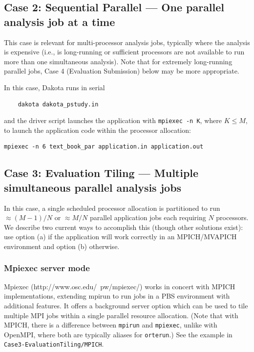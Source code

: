 \subsection{Case 2: Sequential Parallel --- One parallel analysis job at a time}

This case is relevant for multi-processor analysis jobs, typically
where the analysis is expensive (i.e., is long-running or sufficient
processors are not available to run more than one simultaneous
analysis).  Note that for extremely long-running parallel jobs, Case 4 (Evaluation
Submission) below may be more appropriate.

In this case, Dakota runs in serial
\begin{verbatim}
    dakota dakota_pstudy.in
\end{verbatim}
and the driver script launches the application with {\tt mpiexec -n
K}, where $K \leq M$, to launch the application code within the
processor allocation:
\begin{verbatim}
mpiexec -n 6 text_book_par application.in application.out
\end{verbatim}
\subsection{Case 3: Evaluation Tiling --- Multiple simultaneous parallel analysis jobs}

In this case, a single scheduled processor allocation
is partitioned to run $\approx (M-1)/N$ or $\approx M/N$ parallel
application jobs each requiring $N$ processors.  We describe two 
current ways to accomplish this (though other solutions exist): use 
option (a) if the application will work correctly in an MPICH/MVAPICH 
environment and option (b) otherwise.

\subsubsection{Mpiexec server mode}

Mpiexec (http://www.osc.edu/~pw/mpiexec/) works in concert with MPICH
implementations, extending mpirun to run jobs in a PBS environment
with additional features.  It offers a background server option which
can be used to tile multiple MPI jobs within a single parallel
resource allocation.  (Note that with MPICH, there is a difference
between {\tt mpirun} and {\tt mpiexec}, unlike with OpenMPI, where
both are typically aliases for {\tt orterun}.)  See the example in
\texttt{Case3-EvaluationTiling/MPICH}.

